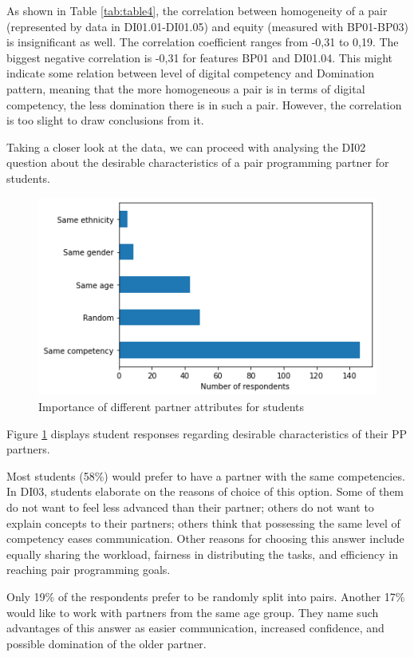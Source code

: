 \documentclass[conference]{IEEEtran}
\begin{document}
As shown in Table \ref{tab:table4}, the correlation between homogeneity of a pair (represented by data in DI01.01-DI01.05) and equity (measured with BP01-BP03) is insignificant as well. The correlation coefficient ranges from -0,31 to 0,19. The biggest negative correlation is -0,31 for features BP01 and DI01.04. This might indicate some relation between level of digital competency and Domination pattern, meaning that the more homogeneous a pair is in terms of digital competency, the less domination there is in such a pair. However, the correlation is too slight to draw conclusions from it.

Taking a closer look at the data, we can proceed with analysing the DI02 question about the desirable characteristics of a pair programming partner for students.

\begin{figure}[ht]
\includegraphics[scale=0.5]{important-attribute.png}
\caption{Importance of different partner attributes for students}
\label{fig:impAttr}
\end{figure}

Figure \ref{fig:impAttr} displays student responses regarding desirable characteristics of their PP partners. 

Most students (58\%) would prefer to have a partner with the same competencies. In DI03, students elaborate on the reasons of choice of this option. Some of them do not want to feel less advanced than their partner; others do not want to explain concepts to their partners; others think that possessing the same level of competency eases communication. Other reasons for choosing this answer include equally sharing the workload, fairness in distributing the tasks, and efficiency in reaching pair programming goals.

Only 19\% of the respondents prefer to be randomly split into pairs. Another 17\% would like to work with partners from the same age group. They name such advantages of this answer as easier communication, increased confidence, and possible domination of the older partner.
\end{document}
